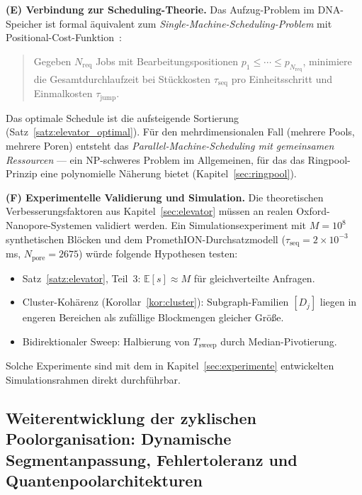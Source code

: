 ﻿\documentclass[a4paper,12pt]{article}
\theoremstyle{definition}
\theoremstyle{plain}
\begin{document}
\textbf{(E) Verbindung zur Scheduling-Theorie.}
Das Aufzug-Problem im DNA-Speicher ist formal äquivalent zum
\emph{Single-Machine-Scheduling-Problem} mit
Positional-Cost-Funktion~\cite{knuth1998}:
\begin{quote}
  Gegeben $N_{\mathrm{req}}$ Jobs mit Bearbeitungspositionen
  $p_1 \le \cdots \le p_{N_{\mathrm{req}}}$, minimiere die
  Gesamtdurchlaufzeit bei Stückkosten $\tau_{\mathrm{seq}}$ pro
  Einheitsschritt und Einmalkosten $\tau_{\mathrm{jump}}$.
\end{quote}
Das optimale Schedule ist die aufsteigende Sortierung (Satz~\ref{satz:elevator_optimal}).
Für den mehrdimensionalen Fall (mehrere Pools, mehrere Poren) entsteht
das \emph{Parallel-Machine-Scheduling mit gemeinsamen Ressourcen} ---
ein NP-schweres Problem im Allgemeinen, für das das Ringpool-Prinzip
eine polynomielle Näherung bietet (Kapitel~\ref{sec:ringpool}).

\textbf{(F) Experimentelle Validierung und Simulation.}
Die theoretischen Verbesserungsfaktoren aus Kapitel~\ref{sec:elevator}
müssen an realen Oxford-Nanopore-Systemen validiert werden.  Ein
Simulationsexperiment mit $M = 10^8$ synthetischen Blöcken und dem
PromethION-Durchsatzmodell ($\tau_{\mathrm{seq}} = 2 \times 10^{-3}$ ms,
$N_{\mathrm{pore}} = 2675$) würde folgende Hypothesen testen:
\begin{itemize}
  \item Satz~\ref{satz:elevator}, Teil~3: $\mathbb{E}[s] \approx M$
        für gleichverteilte Anfragen.
  \item Cluster-Kohärenz (Korollar~\ref{kor:cluster}):
        Subgraph-Familien $[D_j]$ liegen in engeren Bereichen als
        zufällige Blockmengen gleicher Größe.
  \item Bidirektionaler Sweep: Halbierung von $T_{\mathrm{sweep}}$
        durch Median-Pivotierung.
\end{itemize}
Solche Experimente sind mit dem in Kapitel~\ref{sec:experimente}
entwickelten Simulationsrahmen direkt durchführbar.

\subsection{Weiterentwicklung der zyklischen Poolorganisation: Dynamische
           Segmentanpassung, Fehlertoleranz und Quantenpoolarchitekturen}
\label{ssec:ausblick_ringpool}
\end{document}
